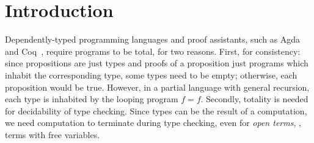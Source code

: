 \documentclass[acmsmall%
]{acmart}\settopmatter{printfolios=true}
\begin{document}




\maketitle


\section{Introduction}
\label{sec:intro}



Dependently-typed programming languages and proof assistants, such as Agda~\citeyearpar{agdawiki} and Coq~\cite{inria:coq86}, require programs to be total, for two reasons.  First, for consistency:  since propositions are just types and proofs of a proposition just programs which inhabit the corresponding type, some types need to be empty; otherwise, each proposition would be true.  However, in a partial language with general recursion, each type is inhabited by the looping program $f = f$.  Secondly, totality is needed for decidability of type checking.  Since types can be the result of a computation, we need computation to terminate during type checking, even for \emph{open terms}, \ie, terms with free variables.
\end{document}
